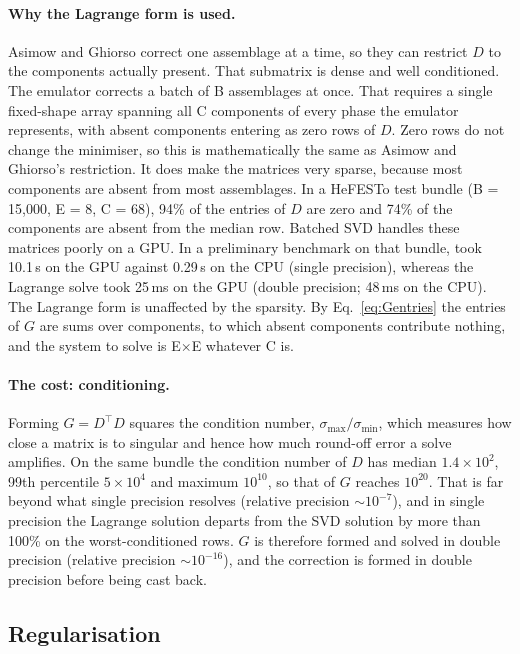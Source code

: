 \documentclass[11pt]{article}
\newcommand{\code}[1]{\texttt{\detokenize{#1}}}
\begin{document}
\paragraph{Why the Lagrange form is used.} Asimow and Ghiorso correct one assemblage at a
time, so they can restrict $D$ to the components actually present. That submatrix is dense
and well conditioned. The emulator corrects a batch of B assemblages at once. That requires
a single fixed-shape array spanning all C components of every phase the emulator
represents, with absent components entering as zero rows of $D$. Zero rows do not change
the minimiser, so this is mathematically the same as Asimow and Ghiorso's restriction. It
does make the matrices very sparse, because most components are absent from most
assemblages. In a HeFESTo test bundle (B = 15{,}000, E = 8, C = 68), 94\% of the entries
of $D$ are zero and 74\% of the components are absent from the median row.
Batched SVD handles these matrices poorly on a GPU. In a preliminary benchmark on that
bundle, \code{torch.linalg.pinv} took 10.1\,s on the GPU against 0.29\,s on the CPU (single
precision), whereas the Lagrange solve took 25\,ms on the GPU (double precision; 48\,ms on
the CPU). The Lagrange form is unaffected by the sparsity. By Eq.~\eqref{eq:Gentries} the
entries of $G$ are sums over components, to which absent components contribute nothing,
and the system to solve is E$\times$E whatever C is.

\paragraph{The cost: conditioning.} Forming $G = D^{\!\top} D$ squares the condition number,
$\sigma_{\max}/\sigma_{\min}$, which measures how close a matrix is to singular and hence
how much round-off error a solve amplifies. On the same bundle the condition number of $D$
has median $1.4\times10^{2}$, 99th percentile $5\times10^{4}$ and maximum $10^{10}$, so
that of $G$ reaches $10^{20}$. That is far beyond what single precision resolves (relative
precision $\sim\!10^{-7}$), and in single precision the Lagrange solution departs from the SVD
solution by more than 100\% on the worst-conditioned rows. $G$ is therefore formed and solved
in double precision (relative precision $\sim\!10^{-16}$), and the correction is formed in
double precision before being cast back.

\subsection{Regularisation}
\label{sec:mb-reg}
\end{document}
